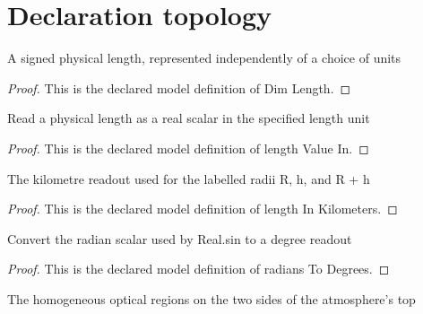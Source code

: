 \section{Declaration topology}
\begin{definition}
  \label{def:physics:phyx-mini-0101:phyxminiproblems-problemphyxmini0101-dimlength}
  A signed physical length, represented independently of a choice of units
\end{definition}
\begin{proof}
  This is the declared model definition of Dim Length.
\end{proof}
\begin{definition}
  \label{def:physics:phyx-mini-0101:phyxminiproblems-problemphyxmini0101-lengthvaluein}
  Read a physical length as a real scalar in the specified length unit
\end{definition}
\begin{proof}
  This is the declared model definition of length Value In.
\end{proof}
\begin{definition}
  \label{def:physics:phyx-mini-0101:phyxminiproblems-problemphyxmini0101-lengthinkilometers}
  The kilometre readout used for the labelled radii R, h, and R + h
\end{definition}
\begin{proof}
  This is the declared model definition of length In Kilometers.
\end{proof}
\begin{definition}
  \label{def:physics:phyx-mini-0101:phyxminiproblems-problemphyxmini0101-radianstodegrees}
  Convert the radian scalar used by Real.sin to a degree readout
\end{definition}
\begin{proof}
  This is the declared model definition of radians To Degrees.
\end{proof}
\begin{definition}
  \label{def:physics:phyx-mini-0101:phyxminiproblems-problemphyxmini0101-opticalregion}
  The homogeneous optical regions on the two sides of the atmosphere's top
\end{definition}
